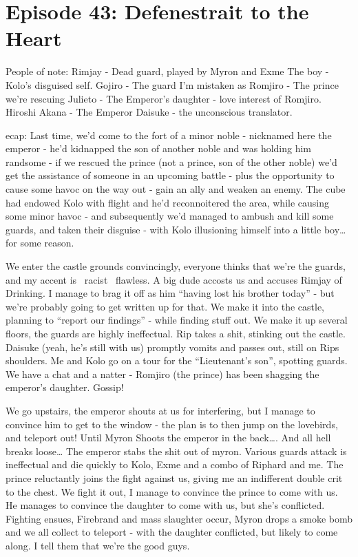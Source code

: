 \section{Episode 43: Defenestrait to the Heart}

\begin{multicols}{2}

\noindent
People of note: Rimjay - Dead guard, played by Myron and Exme
The boy - Kolo’s disguised self.
Gojiro - The guard I’m mistaken as
Romjiro - The prince we’re rescuing
Julieto - The Emperor’s daughter - love interest of Romjiro.
Hiroshi Akana - The Emperor
Daisuke - the unconscious translator.

ecap: Last time, we’d come to the fort of a minor noble - nicknamed here the emperor - he’d kidnapped the son of another noble and was holding him randsome - if we rescued the prince (not a prince, son of the other noble) we’d get the assistance of someone in an upcoming battle - plus the opportunity to cause some havoc on the way out - gain an ally and weaken an enemy. The cube had endowed Kolo with flight and he’d reconnoitered the area, while causing some minor havoc - and subsequently we’d managed to ambush and kill some guards, and taken their disguise - with Kolo illusioning himself into a little boy… for some reason.\medskip

We enter the castle grounds convincingly, everyone thinks that we’re the guards, and my accent is ~racist~ flawless. A big dude accosts us and accuses Rimjay of Drinking. I manage to brag it off as him “having lost his brother today” - but we’re probably going to get written up for that. We make it into the castle, planning to “report our findings” - while finding stuff out. We make it up several floors, the guards are highly ineffectual. Rip takes a shit, stinking out the castle. Daisuke (yeah, he's still with us) promptly vomits and passes out, still on Rips shoulders. Me and Kolo go on a tour for the “Lieutenant’s son”, spotting guards. We have a chat and a natter - Romjiro (the prince) has been shagging the emperor’s daughter. Gossip!\medskip

We go upstairs, the emperor shouts at us for interfering, but I manage to convince him to get to the window - the plan is to then jump on the lovebirds, and teleport out! Until Myron Shoots the emperor in the back…. And all hell breaks loose… The emperor stabs the shit out of myron. Various guards attack is ineffectual and die quickly to Kolo, Exme and a combo of Riphard and me. The prince reluctantly joins the fight against us, giving me an indifferent double crit to the chest. We fight it out, I manage to convince the prince to come with us. He manages to convince the daughter to come with us, but she’s conflicted. Fighting ensues, Firebrand and mass slaughter occur, Myron drops a smoke bomb and we all collect to teleport - with the daughter conflicted, but likely to come along. I tell them that we’re the good guys.\medskip


\end{multicols}

